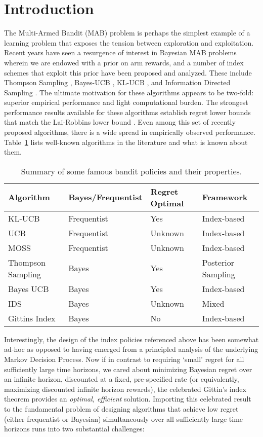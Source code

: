 \section{Introduction} \label{sec:intro}
The Multi-Armed Bandit (MAB) problem is perhaps the simplest example of a learning problem that exposes the tension between exploration and exploitation. Recent years have seen a resurgence of interest in Bayesian MAB problems wherein we are endowed with a prior on arm rewards, and a number of index schemes that exploit this prior have been proposed and analyzed. These include Thompson Sampling \citep{thompson1933likelihood}, Bayes-UCB \citep{kaufmann2012thompson}, KL-UCB \citep{garivier2011kl}, and Information Directed Sampling \citep{russo2014learning}. The ultimate motivation for these algorithms appears to be two-fold: superior empirical performance and light computational burden. The strongest performance results available for these algorithms establish regret lower bounds that match the Lai-Robbins lower bound \citep{lai1985asymptotically}.  Even among this set of recently proposed algorithms, there is a wide spread in empirically observed performance. Table~\ref{table:intro_algorithm_summary} lists well-known algorithms in the literature and what is known about them.

\begin{table}
	\centering
	\begin{tabular}{@{}llll}\toprule
		Algorithm & Bayes/Frequentist & Regret Optimal & Framework \\ \midrule
		KL-UCB & Frequentist & Yes & Index-based \\
		UCB & Frequentist & Unknown & Index-based \\
		MOSS & Frequentist & Unknown & Index-based \\
		Thompson Sampling &Bayes & Yes & Posterior Sampling \\
		Bayes UCB & Bayes & Yes & Index-based \\
		IDS & Bayes & Unknown  & Mixed \\
		Gittins Index & Bayes & No & Index-based \\
		\bottomrule
	\end{tabular}
	\caption{Summary of some famous bandit policies and their properties.}
	\label{table:intro_algorithm_summary}
\end{table}

Interestingly, the design of the index policies referenced above has been somewhat ad-hoc as opposed to having emerged from a principled analysis of the underlying Markov Decision Process. Now if in contrast to requiring `small' regret for all sufficiently large time horizons, we cared about minimizing Bayesian regret over an infinite horizon, discounted at a fixed, pre-specified rate (or equivalently, maximizing discounted infinite horizon rewards), the celebrated Gittin's index theorem provides an {\em optimal, efficient} solution. Importing this celebrated result to the fundamental problem of designing algorithms that achieve low regret (either frequentist or Bayesian) simultaneously over all sufficiently large time horizons runs into two substantial challenges:

